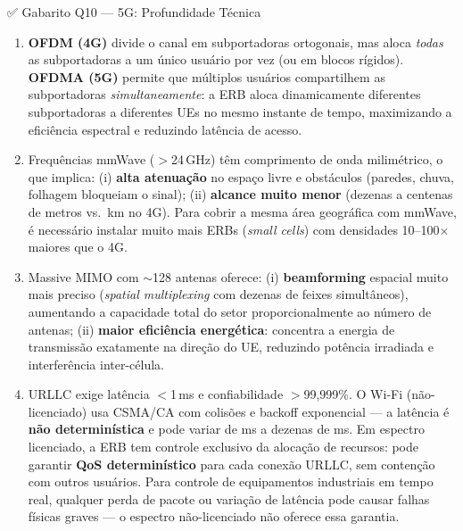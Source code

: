 \documentclass[11pt,a4paper]{article}
\begin{document}
\begin{gabaritocaixa}{✅ Gabarito Q10 --- 5G: Profundidade Técnica}
\begin{enumerate}[label=(\alph*)]
    \item \textbf{OFDM (4G)} divide o canal em subportadoras ortogonais, mas aloca \emph{todas} as subportadoras a um único usuário por vez (ou em blocos rígidos). \textbf{OFDMA (5G)} permite que múltiplos usuários compartilhem as subportadoras \emph{simultaneamente}: a ERB aloca dinamicamente diferentes subportadoras a diferentes UEs no mesmo instante de tempo, maximizando a eficiência espectral e reduzindo latência de acesso.

    \item Frequências mmWave ($>$24\,GHz) têm comprimento de onda milimétrico, o que implica: (i) \textbf{alta atenuação} no espaço livre e obstáculos (paredes, chuva, folhagem bloqueiam o sinal); (ii) \textbf{alcance muito menor} (dezenas a centenas de metros vs.\ km no 4G). Para cobrir a mesma área geográfica com mmWave, é necessário instalar muito mais ERBs (\textit{small cells}) com densidades 10--100$\times$ maiores que o 4G.

    \item Massive MIMO com $\sim$128 antenas oferece: (i) \textbf{beamforming} espacial muito mais preciso (\textit{spatial multiplexing} com dezenas de feixes simultâneos), aumentando a capacidade total do setor proporcionalmente ao número de antenas; (ii) \textbf{maior eficiência energética}: concentra a energia de transmissão exatamente na direção do UE, reduzindo potência irradiada e interferência inter-célula.

    \item URLLC exige latência $<$1\,ms e confiabilidade $>$99{,}999\%. O Wi-Fi (não-licenciado) usa CSMA/CA com colisões e backoff exponencial --- a latência é \textbf{não determinística} e pode variar de ms a dezenas de ms. Em espectro licenciado, a ERB tem controle exclusivo da alocação de recursos: pode garantir \textbf{QoS determinístico} para cada conexão URLLC, sem contenção com outros usuários. Para controle de equipamentos industriais em tempo real, qualquer perda de pacote ou variação de latência pode causar falhas físicas graves --- o espectro não-licenciado não oferece essa garantia.
\end{enumerate}
\end{gabaritocaixa}
\end{document}
